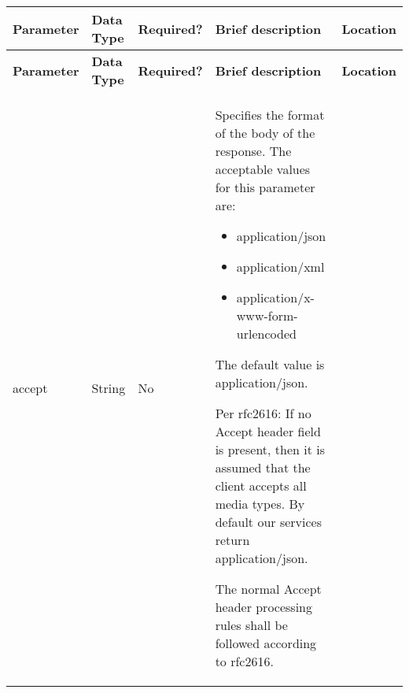 {\footnotesize{}}%
\begin{longtable}{|>{\raggedright}p{}|>{\raggedright}p{}|>{\raggedright}p{}|>{\raggedright}p{}|>{\raggedright}p{}|}
\hline
\hline 
\textbf{\footnotesize{Parameter }} & \textbf{\footnotesize{Data Type}} & \textbf{\footnotesize{Required?}} & \textbf{\footnotesize{Brief description}} & \textbf{\footnotesize{Location}}\tabularnewline
\hline 
\hline
\endfirsthead
\hline
\hline 
\textbf{\footnotesize{Parameter }} & \textbf{\footnotesize{Data Type}} & \textbf{\footnotesize{Required?}} & \textbf{\footnotesize{Brief description}} & \textbf{\footnotesize{Location}}\tabularnewline
\hline 
\hline
\endhead
\hline 
{\footnotesize{accept}} & {\footnotesize{String}} & {\footnotesize{No}} & {\footnotesize{Specifies the format of the body of the response. The
acceptable values for this parameter are:}}{\footnotesize \par}
\begin{itemize}
\item {\footnotesize{application/json}}{\footnotesize \par}
\item {\footnotesize{application/xml}}{\footnotesize \par}
\item {\footnotesize{application/x-www-form-urlencoded}}{\footnotesize \par}
\end{itemize}
{\footnotesize{The default value is application/json. }}{\footnotesize \par}

{\footnotesize{Per rfc2616: \textquotedbl{}If no Accept header field
is present, then it is assumed that the client accepts all media types.\textquotedbl{}
By default our services return application/json.}}{\footnotesize \par}

{\footnotesize{The normal Accept header processing rules shall be
followed according to rfc2616.}}{\footnotesize \par}


\end{longtable}
